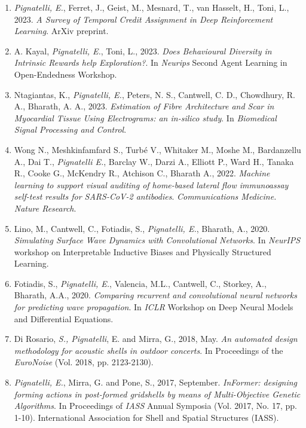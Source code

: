\begin{publications}
    \begin{enumerate}[leftmargin=0.45cm, itemsep=0em, topsep=0.5em, parsep=0.2em]
        \item \emph{Pignatelli, E.}, Ferret, J., Geist, M., Mesnard, T., van Hasselt, H., Toni, L., 2023. \textit{A Survey of Temporal Credit Assignment in Deep Reinforcement Learning}. ArXiv preprint.%
        \item A. Kayal, \emph{Pignatelli, E.}, Toni, L., 2023. \textit{Does Behavioural Diversity in Intrinsic Rewards help Exploration?}. In \emph{Neurips} Second Agent Learning in Open-Endedness Workshop.
        \item Ntagiantas, K., \emph{Pignatelli, E.}, Peters, N. S., Cantwell, C. D., Chowdhury, R. A., Bharath, A. A., 2023. \textit{Estimation of Fibre Architecture and Scar in Myocardial Tissue Using Electrograms: an in-silico study}. In \textit{Biomedical Signal Processing and Control}.
        \item Wong N., Meshkinfamfard S., Turbé V., Whitaker M., Moshe M., Bardanzellu A., Dai T., \emph{Pignatelli E.}, Barclay W., Darzi A., Elliott P., Ward H., Tanaka R., Cooke G., McKendry R., Atchison C., Bharath A., 2022. \textit{Machine learning to support visual auditing of home-based lateral flow immunoassay self-test results for SARS-CoV-2 antibodies}. \emph{Communications Medicine. Nature Research}.
        \item Lino, M., Cantwell, C., Fotiadis, S., \emph{Pignatelli, E.}, Bharath, A., 2020. \textit{Simulating Surface Wave Dynamics with Convolutional Networks}. In \emph{NeurIPS} workshop on Interpretable Inductive Biases and Physically Structured Learning.
        \item Fotiadis, S., \emph{Pignatelli, E.}, Valencia, M.L., Cantwell, C., Storkey, A., Bharath, A.A., 2020. \textit{Comparing recurrent and convolutional neural networks for predicting wave propagation}. In \emph{ICLR} Workshop on Deep Neural Models and Differential Equations.
        \item Di Rosario, \emph{S., Pignatelli}, E. and Mirra, G., 2018, May. \textit{An automated design methodology for acoustic shells in outdoor concerts}. In Proceedings of the \emph{EuroNoise} (Vol. 2018, pp. 2123-2130).
        \item \emph{Pignatelli, E.}, Mirra, G. and Pone, S., 2017, September. \textit{InFormer: designing forming actions in post-formed gridshells by means of Multi-Objective Genetic Algorithms}. In Proceedings of \emph{IASS} Annual Symposia (Vol. 2017, No. 17, pp. 1-10). International Association for Shell and Spatial Structures (IASS).

\end{enumerate}
\end{publications}
